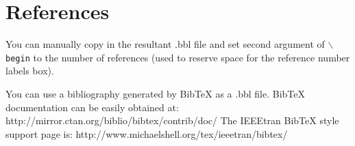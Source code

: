 \documentclass[lettersize,journal]{IEEEtran}
\begin{document}
\section{References}
You can manually copy in the resultant .bbl file and set second argument of $\backslash${\tt{begin}} to the number of references
 (used to reserve space for the reference number labels box).

You can use a bibliography generated by BibTeX as a .bbl file.
 BibTeX documentation can be easily obtained at:
 http://mirror.ctan.org/biblio/bibtex/contrib/doc/
 The IEEEtran BibTeX style support page is:
 http://www.michaelshell.org/tex/ieeetran/bibtex/
 
%
%
\end{document}
